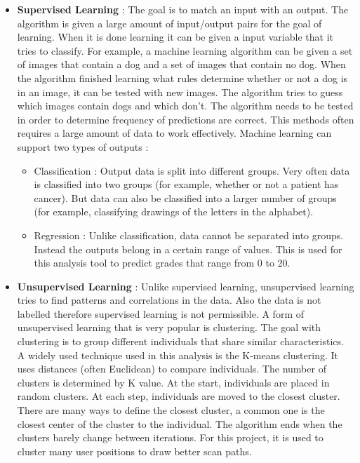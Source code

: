 \documentclass[a4paper,11pt]{report}
\numberwithin{figure}{chapter} %
\begin{document}
    \begin{itemize}
        \item[\textbullet] \textbf{Supervised Learning} : The goal is to match an input with an output.
        The algorithm is given a large amount of input/output pairs for the goal of learning.
        When it is done learning it can be given a input variable that it tries to classify.
        For example, a machine learning algorithm can be given a set of images that contain a dog and a set of images that contain no dog.
        When the algorithm finished learning what rules determine whether or not a dog is in an image, it can be tested with new images.
        The algorithm tries to guess which images contain dogs and which don't.
        The algorithm needs to be tested in order to determine frequency of predictions are correct.
        This methods often requires a large amount of data to work effectively.
        Machine learning can support two types of outputs :
        \begin{itemize}
            \item Classification : Output data is split into different groups.
            Very often data is classified into two groups (for example, whether or not a patient has cancer).
            But data can also be classified into a larger number of groups (for example, classifying drawings of the letters in the alphabet).
            \item Regression : Unlike classification, data cannot be separated into groups.
            Instead the outputs belong in a certain range of values.
            This is used for this analysis tool to predict grades that range from 0 to 20.
        \end{itemize}
        \item[\textbullet] \textbf{Unsupervised Learning} : Unlike supervised learning, unsupervised learning tries to find patterns and correlations in the data.
        Also the data is not labelled therefore supervised learning is not permissible.
        A form of unsupervised learning that is very popular is clustering.
        The goal with clustering is to group different individuals that share similar characteristics.
        A widely used technique used in this analysis is the K-means clustering.
        It uses distances (often Euclidean) to compare individuals.
        The number of clusters is determined by K value.
        At the start, individuals are placed in random clusters.
        At each step, individuals are moved to the closest cluster.
        There are many ways to define the closest cluster, a common one is the closest center of the cluster to the individual.
        The algorithm ends when the clusters barely change between iterations.
        For this project, it is used to cluster many user positions to draw better scan paths.
    \end{itemize}
\end{document}
